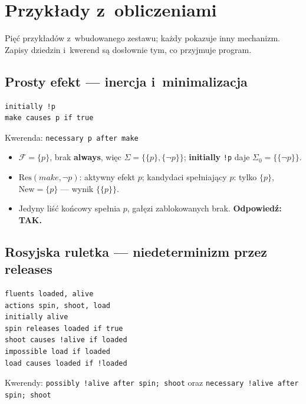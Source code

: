 \documentclass[11pt,a4paper]{article}
\newcommand{\Res}{\mathrm{Res}}
\newcommand{\New}{\mathrm{New}}
\begin{document}
\section{Przykłady z~obliczeniami}

Pięć przykładów z~wbudowanego zestawu; każdy pokazuje inny mechanizm.
Zapisy dziedzin i~kwerend są dosłownie tym, co przyjmuje program.

\subsection{Prosty efekt --- inercja i~minimalizacja}

\begin{verbatim}
initially !p
make causes p if true
\end{verbatim}
Kwerenda: \texttt{necessary p after make}

\begin{itemize}
  \item $\mathcal{F}=\{p\}$, brak \textbf{always}, więc
        $\Sigma = \{\{p\},\{\lnot p\}\}$; \textbf{initially} \texttt{!p} daje
        $\Sigma_0 = \{\{\lnot p\}\}$.
  \item $\Res(\mathit{make}, \lnot p)$: aktywny efekt $p$; kandydaci spełniający
        $p$: tylko $\{p\}$, $\New = \{p\}$ --- wynik $\{\{p\}\}$.
  \item Jedyny liść końcowy spełnia $p$, gałęzi zablokowanych brak.
        \textbf{Odpowiedź: TAK.}
\end{itemize}

\subsection{Rosyjska ruletka --- niedeterminizm przez \textbf{releases}}

\begin{verbatim}
fluents loaded, alive
actions spin, shoot, load
initially alive
spin releases loaded if true
shoot causes !alive if loaded
impossible load if loaded
load causes loaded if !loaded
\end{verbatim}
Kwerendy: \texttt{possibly !alive after spin; shoot} \quad oraz \quad
\texttt{necessary !alive after spin; shoot}
\end{document}
